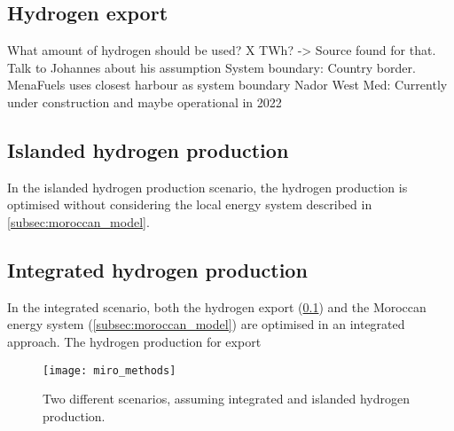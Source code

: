 \subsection{Hydrogen export}
\label{subsec:hydrogen_export}
What amount of hydrogen should be used? X TWh? -> Source found for that. Talk to Johannes about his assumption
System boundary: Country border. MenaFuels uses closest harbour as system boundary
Nador West Med: Currently under construction and maybe operational in 2022 \cite{Ersoy2022}



\subsection{Islanded hydrogen production}
In the islanded hydrogen production scenario, the hydrogen production is optimised without considering the local energy system described in \ref{subsec:moroccan_model}.


\subsection{Integrated hydrogen production}
In the integrated scenario, both the hydrogen export (\ref{subsec:hydrogen_export}) and the Moroccan energy system (\ref{subsec:moroccan_model})
are optimised in an integrated approach.
The hydrogen production for export


\begin{figure}[h!]
    \centering
    \texttt{[image: miro\_methods]}
    \caption{Two different scenarios, assuming integrated and islanded hydrogen production.}
    \label{fig:methods_scenarios}
\end{figure}

